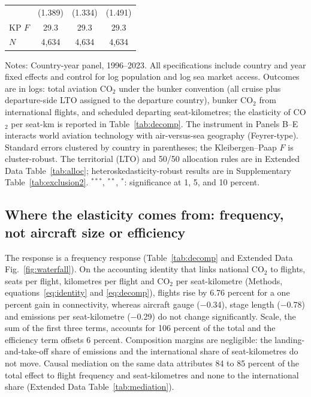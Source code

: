 \documentclass[12pt]{extarticle}
\begin{document}
\begin{table}[H]
{\begin{threeparttable}
\begin{tabular}{lccc}
 & (1.389) & (1.334) & (1.491) \\
KP $F$ & 29.3 & 29.3 & 29.3 \\
$N$ & 4,634 & 4,634 & 4,634 \\
\bottomrule
\end{tabular}
\begin{tablenotes}[flushleft]
\footnotesize
\item Notes: Country-year panel, 1996--2023. All specifications include country and year fixed effects and control for log population and log sea market access. Outcomes are in logs: total aviation CO$_2$ under the bunker convention (all cruise plus departure-side LTO assigned to the departure country), bunker CO$_2$ from international flights, and scheduled departing seat-kilometres; the elasticity of CO$_2$ per seat-km is reported in Table~\ref{tab:decomp}. The instrument in Panels B--E interacts world aviation technology with air-versus-sea geography (Feyrer-type). Standard errors clustered by country in parentheses; the Kleibergen--Paap $F$ is cluster-robust. The territorial (LTO) and 50/50 allocation rules are in Extended Data Table~\ref{tab:alloc}; heteroskedasticity-robust results are in Supplementary Table~\ref{tab:exclusion2}. $^{***}$, $^{**}$, $^{*}$: significance at 1, 5, and 10 percent.
\end{tablenotes}
\end{threeparttable}}
\end{table}

\subsection*{Where the elasticity comes from: frequency, not aircraft size
or efficiency}
The response is a frequency response (Table~\ref{tab:decomp} and Extended
Data Fig.~\ref{fig:waterfall}). On the accounting identity that links
national CO$_2$ to flights, seats per flight, kilometres per flight and
CO$_2$ per seat-kilometre (Methods, equations~\ref{eq:identity} and
\ref{eq:decomp}), flights rise by 6.76 percent for a one percent gain in
connectivity, whereas aircraft gauge ($-$0.34), stage length ($-$0.78) and
emissions per seat-kilometre ($-$0.29) do not change significantly. Scale, the sum of the first three terms, accounts for 106
percent of the total and the efficiency term offsets 6 percent.
Composition margins are negligible: the landing-and-take-off share of
emissions and the international share of seat-kilometres do not move.
Causal mediation on the same data attributes 84 to 85 percent of the total
effect to flight frequency and seat-kilometres and none to the
international share (Extended Data Table~\ref{tab:mediation}).
\end{document}

